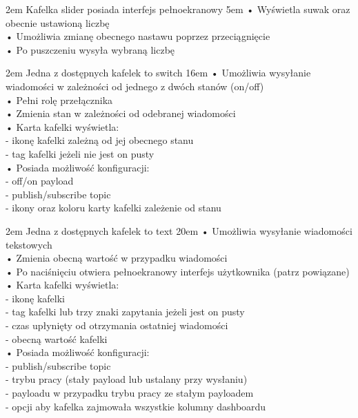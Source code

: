 {2em}{
    Kafelka slider posiada interfejs pełnoekranowy}
{5em}{
    • Wyświetla suwak oraz obecnie ustawioną liczbę\\
    • Umożliwia zmianę obecnego nastawu poprzez przeciągnięcie\\
    • Po puszczeniu wysyła wybraną liczbę
}

{2em}{
    Jedna z dostępnych kafelek to switch
}
{16em}{
    • Umożliwia wysyłanie wiadomości w zależności od jednego z dwóch stanów (on/off)\\
    • Pełni rolę przełącznika\\
    • Zmienia stan w zależności od odebranej wiadomości\\

    • Karta kafelki wyświetla:\\
    - ikonę kafelki zależną od jej obecnego stanu\\
    - tag kafelki jeżeli nie jest on pusty\\

    • Posiada możliwość konfiguracji:\\
    - off/on payload\\
    - publish/subscribe topic\\
    - ikony oraz koloru karty kafelki zależenie od stanu
}

{2em}{
    Jedna z dostępnych kafelek to text
}
{20em}{
    • Umożliwia wysyłanie wiadomości tekstowych\\
    • Zmienia obecną wartość w przypadku wiadomości\\
    • Po naciśnięciu otwiera pełnoekranowy interfejs użytkownika (patrz powiązane)\\

    • Karta kafelki wyświetla:\\
    - ikonę kafelki\\
    - tag kafelki lub trzy znaki zapytania jeżeli jest on pusty\\
    - czas upłynięty od otrzymania ostatniej wiadomości\\
    - obecną wartość kafelki\\

    • Posiada możliwość konfiguracji:\\
    - publish/subscribe topic\\
    - trybu pracy (stały payload lub ustalany przy wysłaniu)\\
    - payloadu w przypadku trybu pracy ze stałym payloadem\\
    - opcji aby kafelka zajmowała wszystkie kolumny dashboardu
}

